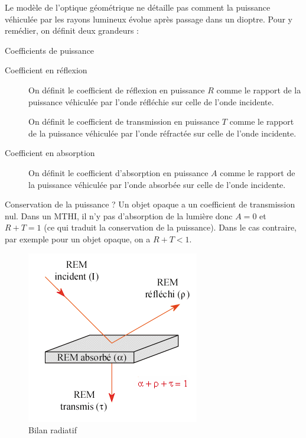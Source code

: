 \documentclass{classe}
\begin{document}
Le modèle de l'optique géométrique ne détaille pas comment la puissance véhiculée par les rayons lumineux évolue après passage dans un dioptre. Pour y remédier, on définit deux grandeurs :
\begin{définition}{Coefficients de puissance}{}
	\begin{description}
		\item[\color{vulm} Coefficient en réflexion] \color{black} On définit le coefficient de réflexion en puissance $R$ comme le rapport de la puissance véhiculée par l'onde réfléchie sur celle de l'onde incidente.
		\item[\color{vulm}{Coefficient en transmission}] \color{black} On définit le coefficient de transmission en puissance $T$ comme le rapport de la puissance véhiculée par l'onde réfractée sur celle de l'onde incidente.
		\item[\color{vulm} Coefficient en absorption] \color{black} On définit le coefficient d'absorption en puissance $A$ comme le rapport de la puissance véhiculée par l'onde absorbée sur celle de l'onde incidente.
	\end{description}
\end{définition}
\begin{remarque}{Conservation de la puissance ?}{}
	Un objet opaque a un coefficient de transmission nul.
	Dans un MTHI, il n'y pas d'absorption de la lumière donc $A = 0$ et $R + T = 1$ (ce qui traduit la conservation de la puissance).
	Dans le cas contraire, par exemple pour un objet opaque, on a $R + T < 1$.
\end{remarque}

\begin{figure}[H]
\centering
\includegraphics[scale=.4]{BilanRadiatif.png}
\caption{Bilan radiatif}
\end{figure}
\end{document}
